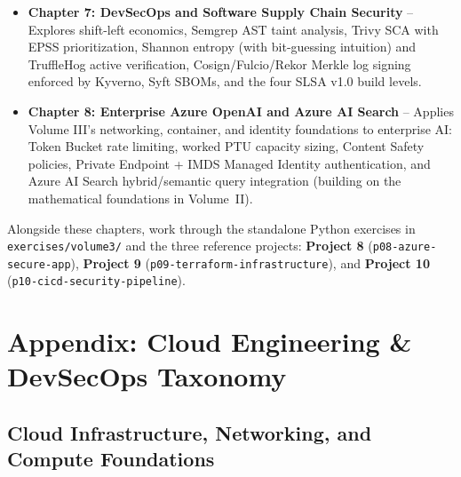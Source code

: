 \documentclass[11pt,oneside]{book}
\begin{document}
\begin{itemize}[leftmargin=15pt]
  \item \textbf{Chapter 7: DevSecOps and Software Supply Chain Security} -- Explores shift-left economics, Semgrep AST taint analysis, Trivy SCA with EPSS prioritization, Shannon entropy (with bit-guessing intuition) and TruffleHog active verification, Cosign/Fulcio/Rekor Merkle log signing enforced by Kyverno, Syft SBOMs, and the four SLSA v1.0 build levels.
  \item \textbf{Chapter 8: Enterprise Azure OpenAI and Azure AI Search} -- Applies Volume III's networking, container, and identity foundations to enterprise AI: Token Bucket rate limiting, worked PTU capacity sizing, Content Safety policies, Private Endpoint + IMDS Managed Identity authentication, and Azure AI Search hybrid/semantic query integration (building on the mathematical foundations in Volume~II).
\end{itemize}

Alongside these chapters, work through the standalone Python exercises in \texttt{exercises/volume3/} and the three reference projects: \textbf{Project 8} (\texttt{p08-azure-secure-app}), \textbf{Project 9} (\texttt{p09-terraform-infrastructure}), and \textbf{Project 10} (\texttt{p10-cicd-security-pipeline}).

\mainmatter










\backmatter

\chapter{Appendix: Cloud Engineering \protect\& DevSecOps Taxonomy}
\label{app:taxonomy}

\section*{Cloud Infrastructure, Networking, and Compute Foundations}
\end{document}
